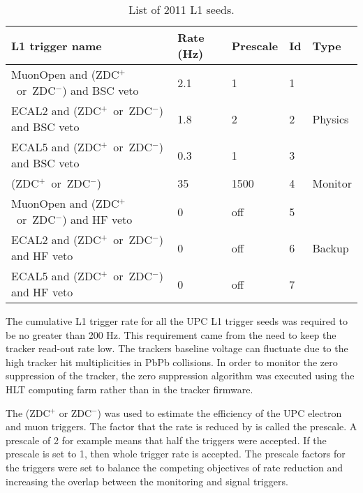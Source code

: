     \begin{table}[h]
      \centering
      \begin{tabular}{|l|l|l|l|l|}
        \hline L1 trigger name & Rate (Hz) & Prescale & Id & Type \\ \hline \hline
        MuonOpen and (ZDC$^{+}$~or~ZDC$^{-}$) and BSC veto & 2.1 & 1 & 1 & \multirow{3}{*}{Physics} \\  \hhline{----~}
        ECAL2 and (ZDC$^{+}$~or~ZDC$^{-}$) and BSC veto & 1.8 & 2 & 2 & \\  \hhline{----~}
        ECAL5 and (ZDC$^{+}$~or~ZDC$^{-}$) and BSC veto & 0.3 & 1 & 3 & \\  \hline
        (ZDC$^{+}$~or~ZDC$^{-}$) & 35 & 1500 & 4 & Monitor \\  \hline
        MuonOpen and (ZDC$^{+}$~or~ZDC$^{-}$) and HF veto & 0 & off & 5 & \multirow{3}{*}{Backup} \\ \hhline{----~}
        ECAL2 and (ZDC$^{+}$~or~ZDC$^{-}$) and HF veto & 0 & off & 6 & \\  \hhline{----~}
        ECAL5 and (ZDC$^{+}$~or~ZDC$^{-}$) and HF veto & 0 & off & 7 & \\  \hline
      \end{tabular}
      \caption{List of 2011 L1 seeds.}
      \label{tab:l1Triggers2011}
    \end{table}
    The cumulative L1 trigger rate for all the UPC L1 trigger seeds was
      required to be no greater than 200 Hz.
    This requirement came from the need to keep the tracker read-out rate
      low. 
    The trackers baseline voltage can fluctuate due to the high tracker hit 
      multiplicities in PbPb collisions.
    In order to monitor the zero suppression of the tracker, the zero 
      suppression algorithm was executed using the HLT computing farm 
	      rather than in the tracker firmware.

    The (ZDC$^{+}$ or ZDC$^{-}$) was used to estimate the efficiency of the UPC electron and muon triggers. 
    The factor that the rate is reduced by is called the prescale.
    A prescale of 2 for example means that half the triggers \DIFdelbegin {}\DIFdelend were 
      accepted.
    If the prescale is set to 1, then whole trigger rate is accepted. 
    The prescale factors for the triggers were set to balance the competing objectives 
      of rate reduction and increasing the overlap between the monitoring and
      signal triggers.

